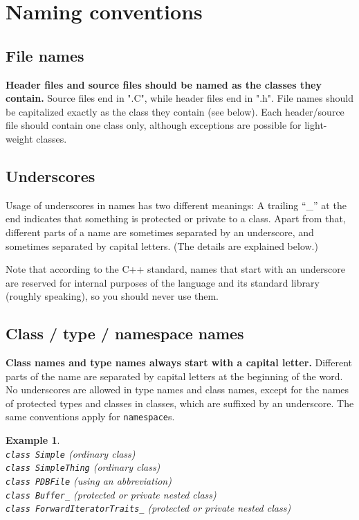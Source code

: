 \documentclass[a4]{article}
\newtheorem{example}{Example}
\begin{document}
\section{Naming conventions}

\subsection{File names}
{\bf Header files and source files should be named as the classes they
contain.}
Source files end in ".C", while header files end in ".h". File names should be
capitalized exactly as the class they contain (see below). Each header/source
file should contain one class only, although exceptions are possible for
light-weight classes.


\subsection{Underscores}

Usage of underscores in names has two different meanings: A trailing ``\_'' at
the end indicates that something is protected or private to a class.  Apart
from that, different parts of a name are sometimes separated by an underscore,
and sometimes separated by capital letters.  (The details are explained below.)

Note that according to the C++ standard, names that start with an underscore
are reserved for internal purposes of the language and its standard library
(roughly speaking), so you should never use them.


\subsection{Class / type / namespace names}

\textbf{Class names and type names always start with a capital letter.}
Different parts of the name are separated by capital letters at the beginning
of the word. No underscores are allowed in type names and class names, except
for the names of protected types and classes in classes, which are suffixed by
an underscore.  The same conventions apply for \texttt{namespace}s.
\begin{example}~\\
  {\tt class Simple} (ordinary class)\\
  {\tt class SimpleThing} (ordinary class)\\
  {\tt class PDBFile} (using an abbreviation)\\
  {\tt class Buffer\_} (protected or private nested class)\\
  {\tt class ForwardIteratorTraits\_} (protected or private nested class)
\end{example}
\end{document}
